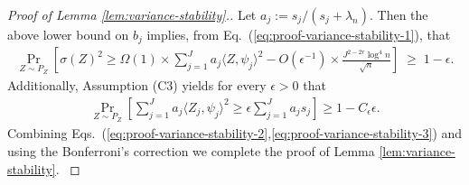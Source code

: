 \documentclass[aos]{imsart}
\renewcommand{\hat}{\widehat}
\newcommand{\pd}[1]{%
	{ \color{blue} PD: #1}%
}
\theoremstyle{plain}
\newtheorem{lemma}{Lemma}[section]
\theoremstyle{definition}
\theoremstyle{definition}
\begin{document}
\begin{appendix}
\begin{proof}[Proof of Lemma \ref{lem:variance-stability}.]
{Let $a_j := s_j/(s_j+\lambda_n)$. Then the above lower bound on $b_j$ implies, from Eq.~(\ref{eq:proof-variance-stability-1}), that
\begin{align}
\Pr_{Z\sim P_Z}\left[\sigma(Z)^2\geq \Omega(1)\times \sum_{j=1}^J a_j\langle Z,\psi_j\rangle^2 - O(\epsilon^{-1})\times\frac{J^{2-2r}\log^4 n}{\sqrt{n}}\right] \;\geq\; 1-\epsilon.
\label{eq:proof-variance-stability-2}
\end{align}
Additionally, Assumption (C3) yields for every $\epsilon>0$ that
\begin{align}
\Pr_{Z\sim P_Z}\left[\sum_{j=1}^J a_j\langle Z_j,\psi_j\rangle^2 \geq \epsilon\sum_{j=1}^J a_js_j\right] \geq 1-C_\epsilon\epsilon.
\label{eq:proof-variance-stability-3}
\end{align}
Combining Eqs.~(\ref{eq:proof-variance-stability-2},\ref{eq:proof-variance-stability-3}) and using the Bonferroni's correction we complete the proof of Lemma \ref{lem:variance-stability}.
}
%
%
\end{proof}
%

\end{appendix}
\end{document}
